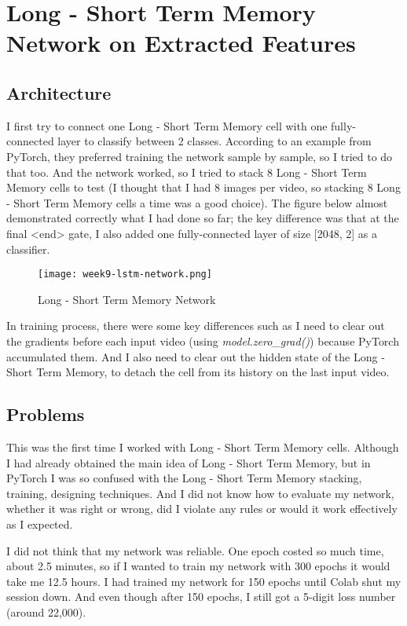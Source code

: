 \section{Long - Short Term Memory Network on Extracted Features}
\subsection{Architecture}
I first try to connect one Long - Short Term Memory\cite{lstm} cell with one fully-connected layer to classify between 2 classes. According to an example from PyTorch, they preferred training the network sample by sample, so I tried to do that too. And the network worked, so I tried to stack 8 Long - Short Term Memory cells to test (I thought that I had 8 images per video, so stacking 8 Long - Short Term Memory cells a time was a good choice). The figure below almost demonstrated correctly what I had done so far; the key difference was that at the final <end> gate, I also added one fully-connected layer of size [2048, 2] as a classifier.

\begin{figure}[!ht]
\centering
\texttt{[image: week9-lstm-network.png]}
\caption{Long - Short Term Memory Network}
\end{figure}

In training process, there were some key differences such as I need to clear out the gradients before each input video (using \emph{model.zero\_grad()}) because PyTorch accumulated them. And I also need to clear out the hidden state of the Long - Short Term Memory, to detach the cell from its history on the last input video.

\subsection{Problems}
This was the first time I worked with Long - Short Term Memory cells. Although I had already obtained the main idea of Long - Short Term Memory, but in PyTorch I was so confused with the Long - Short Term Memory stacking, training, designing techniques. And I did not know how to evaluate my network, whether it was right or wrong, did I violate any rules or would it work effectively as I expected.

I did not think that my network was reliable. One epoch costed so much time, about 2.5 minutes, so if I wanted to train my network with 300 epochs it would take me 12.5 hours. I had trained my network for 150 epochs until Colab shut my session down. And even though after 150 epochs, I still got a 5-digit loss number (around 22,000).